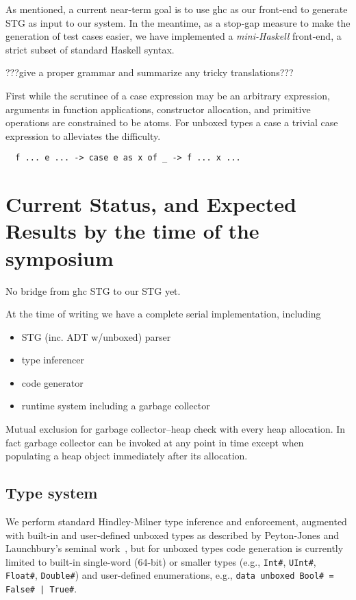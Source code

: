 \documentclass{llncs}
\begin{document}
As mentioned, a current near-term goal is to use ghc as our front-end
to generate STG as input to our system.  In the meantime, as a stop-gap
measure to make the generation of test cases easier, we have implemented
a \emph{mini-Haskell} front-end, a strict subset of standard Haskell syntax.

???give a proper grammar and summarize any tricky translations???   




First while the scrutinee of a case expression may be an arbitrary expression,
arguments in function applications, constructor allocation, and primitive
operations are constrained to be atoms.  For unboxed types a case
a trivial case expression to alleviates
the difficulty.
\begin{verbatim}
  f ... e ... -> case e as x of _ -> f ... x ...
\end{verbatim}



\section{Current Status, and Expected Results by the time of the symposium}

No bridge from ghc STG to our STG yet.

At the time of writing we have a complete serial implementation, including
\begin{itemize}
\item STG (inc. ADT w/unboxed) parser
\item type inferencer
\item code generator
\item runtime system including a garbage collector
\end{itemize}

Mutual exclusion for garbage collector--heap check with every heap allocation.
In fact garbage collector can be invoked at any point in time except when
populating a heap object immediately after its allocation.



\subsection{Type system}

We perform standard Hindley-Milner type inference and enforcement, augmented
with built-in and user-defined unboxed types as described by Peyton-Jones and
Launchbury's seminal work~\cite{unboxed}, but for unboxed types code
generation is currently limited to built-in single-word (64-bit) or smaller
types (e.g., \texttt{Int\#}, \texttt{UInt\#}, \texttt{Float\#}, \texttt{Double\#})
and user-defined enumerations, e.g., \texttt{data unboxed Bool\# = False\# |
  True\#}.
\end{document}
